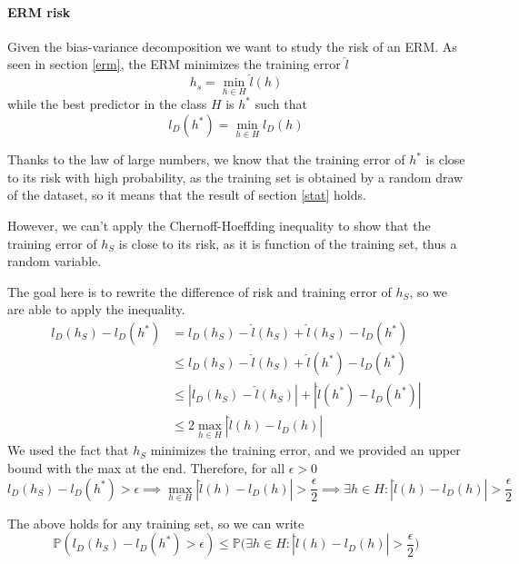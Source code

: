 \paragraph{ERM risk}
Given the bias-variance decomposition we want to study the risk of an ERM.
As seen in section \ref{erm}, the ERM minimizes the training error $\hat{l}$
$$h_s = \min_{h \in H} \hat{l}(h)$$
while the best predictor in the class $H$ is $h^*$ such that
$$l_D(h^*) = \min_{h \in H} l_D(h)$$

Thanks to the law of large numbers, we know that the training error of $h^*$
is close to its risk with high probability, as the training 
set is obtained by a random draw of the dataset, so it means that 
the result of section \vref{stat} holds. 

However, we can't apply the Chernoff-Hoeffding inequality to show that 
the training error of $h_S$ is close to its risk, as it is function of 
the training set, thus a random variable.

The goal here is to rewrite the difference of risk and training error of $h_S$,
so we are able to apply the inequality.
\begin{equation}
    \begin{aligned}
        l_D(h_S) - l_D(h^*) &= l_D(h_S) - \hat{l}(h_S) + \hat{l}(h_S) - l_D(h^*)\\
        &\leq l_D(h_S) - \hat{l}(h_S) + \hat{l}(h^*) - l_D(h^*)\\
        &\leq |l_D(h_S) - \hat{l}(h_S)| + |\hat{l}(h^*) - l_D(h^*)|\\
        &\leq 2\max_{h \in H} |\hat{l}(h) - l_D(h)|
    \end{aligned}
\end{equation}
We used the fact that $h_S$ minimizes the training error, and we provided an upper bound
with the max at the end.
Therefore, for all $\epsilon > 0$
$$l_D(h_S) - l_D(h^*) > \epsilon \implies 
\max_{h \in H} |\hat{l}(h) - l_D(h)| > \frac{\epsilon}{2}
\implies \exists h \in H: |\hat{l}(h) - l_D(h)| > \frac{\epsilon}{2}$$

The above holds for any training set, so we can write 
$$\mathbb{P}(l_D(h_S) - l_D(h^*) > \epsilon) \leq 
\mathbb{P}\bigg(\exists h \in H: |\hat{l}(h) - l_D(h)| > \frac{\epsilon}{2}\bigg)$$

